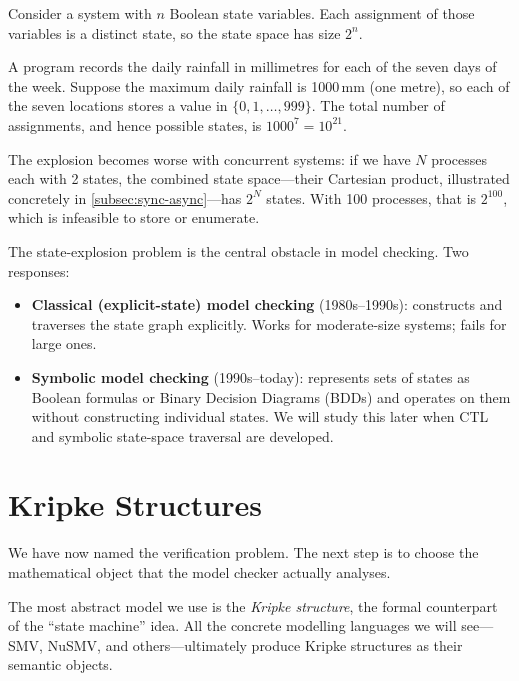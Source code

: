 Consider a system with $n$ Boolean state variables.  Each assignment of those
variables is a distinct state, so the state space has size $2^n$.

\begin{example}
A program records the daily rainfall in millimetres for each of the seven
days of the week.  Suppose the maximum daily rainfall is 1000\,mm (one
metre), so each of the seven locations stores a value in $\{0, 1, \ldots,
999\}$.  The total number of assignments, and hence possible states, is
$1000^7 = 10^{21}$.
\end{example}

The explosion becomes worse with concurrent systems: if we have $N$ processes
each with 2 states, the combined state space---their Cartesian product,
illustrated concretely in \cref{subsec:sync-async}---has $2^N$ states.  With
100 processes, that is $2^{100}$, which is infeasible to store or
enumerate.

The state-explosion problem is the central obstacle in model checking.  Two
responses:
\begin{itemize}
  \item \textbf{Classical (explicit-state) model checking} (1980s--1990s):
        constructs and traverses the state graph explicitly.  Works for
        moderate-size systems; fails for large ones.
  \item \textbf{Symbolic model checking} (1990s--today): represents sets of
        states as Boolean formulas or Binary Decision Diagrams (BDDs) and
        operates on them without constructing individual states.  We will
        study this later when CTL and symbolic state-space traversal are
        developed.
\end{itemize}

\section{Kripke Structures}
\label{sec:kripke}

We have now named the verification problem.  The next step is to choose the
mathematical object that the model checker actually analyses.

The most abstract model we use is the \emph{Kripke structure}, the formal
counterpart of the ``state machine'' idea.  All the concrete modelling
languages we will see---SMV, NuSMV, and others---ultimately produce Kripke
structures as their semantic objects.

